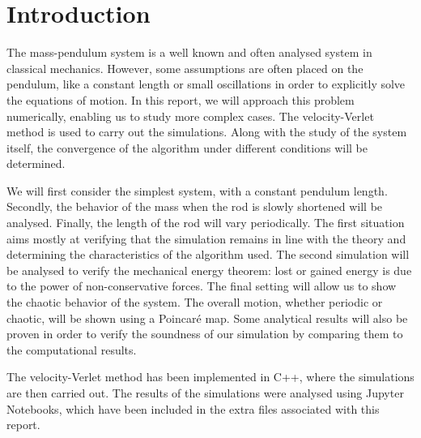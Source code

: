 \section{Introduction}

The mass-pendulum system is a well known and often analysed system in classical mechanics. However, some assumptions are often placed on the pendulum, like a constant length or small oscillations in order to explicitly solve the equations of motion. In this report, we will approach this problem numerically, enabling us to study more complex cases. The velocity-Verlet method is used to carry out the simulations. Along with the study of the system itself, the convergence of the algorithm under different conditions will be determined.

We will first consider the simplest system, with a constant pendulum length. Secondly, the behavior of the mass when the rod is slowly shortened will be analysed. Finally, the length of the rod will vary periodically. The first situation aims mostly at verifying that the simulation remains in line with the theory and determining the characteristics of the algorithm used. The second simulation will be analysed to verify the mechanical energy theorem: lost or gained energy is due to the power of non-conservative forces. The final setting will allow us to show the chaotic behavior of the system. The overall motion, whether periodic or chaotic, will be shown using a Poincaré map. Some analytical results will also be proven in order to verify the soundness of our simulation by comparing them to the computational results.

The velocity-Verlet method has been implemented in C++, where the simulations are then carried out. The results of the simulations were analysed using Jupyter Notebooks, which have been included in the extra files associated with this report.